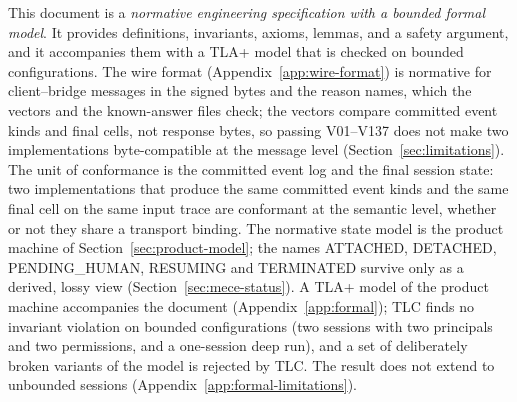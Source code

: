 This document is a \emph{normative engineering specification with a
bounded formal model}. It provides
definitions, invariants, axioms, lemmas, and a safety argument, and
it accompanies them with a TLA+ model that is checked on bounded
configurations. The wire format (Appendix~\ref{app:wire-format}) is
normative for client--bridge messages in the signed bytes and the reason
names, which the vectors and the known-answer files check; the vectors
compare committed event kinds and final cells, not response bytes, so
passing V01--V137 does not make two implementations byte-compatible at the
message level (Section~\ref{sec:limitations}). The unit of
conformance is the committed event log and the final session state:
two implementations that produce the same committed event kinds and
the same final cell on the same input trace are conformant at the
semantic level, whether or not they share a transport binding. The
normative state model is the product
machine of Section~\ref{sec:product-model}; the names ATTACHED, DETACHED, PENDING\_HUMAN, RESUMING and TERMINATED
survive only as a derived, lossy view
(Section~\ref{sec:mece-status}). A TLA+ model of the product machine
accompanies the document (Appendix~\ref{app:formal}); TLC finds no
invariant violation on bounded configurations (two sessions with two
principals and two permissions, and a one-session deep run), and a set of
deliberately broken variants of the model is rejected by TLC. The result
does not extend to unbounded sessions (Appendix~\ref{app:formal-limitations}).


